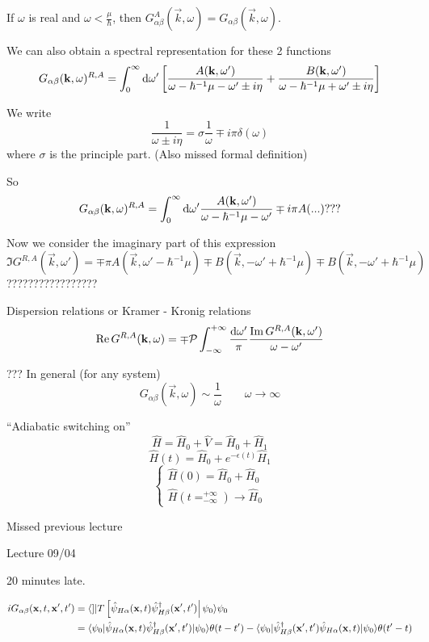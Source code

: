 If $\omega$ is real and $\omega < \frac{\mu}{\hbar}$, then $G^A_{\alpha\beta}(\vec{k},\omega) = G_{\alpha\beta}(\vec{k},\omega)$.

We can also obtain a spectral representation for these 2 functions
\[ G_{\alpha\beta}(\bm{\mathrm{k}},\omega)^{R,A} = \int^\infty_0 \operatorname{d \!}{\omega'}\left[\frac{A(\bm{\mathrm{k}},\omega')}{\omega - \hbar^{-1}\mu - \omega' \pm i\eta} + \frac{B(\bm{\mathrm{k}},\omega')}{\omega - \hbar^{-1}\mu + \omega' \pm i\eta} \right] \]

We write
\[ \frac{1}{\omega \pm i\eta} = \sigma \frac{1}{\omega} \mp i\pi\delta(\omega) \]
where $\sigma$ is the principle part. (Also missed formal definition)

So
\[ G_{\alpha\beta}(\bm{\mathrm{k}},\omega)^{R,A} = \int_0^\infty \operatorname{d \!}{\omega'}\frac{A(\bm{\mathrm{k}},\omega')}{\omega-\hbar^{-1}\mu-\omega'} \mp i\pi A(...) ??? \]


Now we consider the imaginary part of this expression
\[\Im G^{R,A}(\vec{k},\omega') = \mp \pi A(\vec{k}, \omega'-\hbar^{-1}\mu) \mp B(\vec{k}, -\omega' + \hbar^{-1}\mu) \mp B(\vec{k}, -\omega'+\hbar^{-1}\mu)\]
?????????????????

Dispersion relations or Kramer - Kronig relations
\[ \operatorname{Re} G^{R,A}(\bm{\mathrm{k}},\omega) = \mp \mathcal{P}\int^{+\infty}_{-\infty} \frac{\operatorname{d \!}{\omega'}}{\pi}\frac{\operatorname{Im} G^{R,A}(\bm{\mathrm{k}},\omega')}{\omega-\omega'} \]

???
In general (for any system)
\[ G_{\alpha\beta}(\vec{k},\omega) \sim \frac{1}{\omega} \qquad \omega \to \infty \]

``Adiabatic switching on''
\[ \hat{H} = \hat{H}_0 + \hat{V} = \hat{H}_0 + \hat{H}_1 \]
\[\hat{H}(t) = \hat{H}_0 + e^{-\epsilon(t)}\hat{H}_1\]
\[ \begin{cases}
\hat{H}(0) = \hat{H}_0 + \hat{H}_0 \\ \hat{H}(t=^{+\infty}_{-\infty}) \to \hat{H}_0
\end{cases} \]

Missed previous lecture

Lecture 09/04

20 minutes late. 

\begin{align*}
iG_{\alpha\beta}(\vec{x},t,\vec{x}',t') &= \braket[T \left[\hat{\psi}_{H\alpha}(\vec{x},t)\hat{\psi}^\dagger_{H\beta}(\vec{x}',t')\right]]{\psi_0}{\psi_0} \\
&= \braket[\hat{\psi}_{H\alpha}(\vec{x},t)\hat{\psi}_{H\beta}^\dagger(\vec{x}',t')]{\psi_0}{\psi_0}\theta(t-t') - \braket[\hat{\psi}_{H\beta}^\dagger(\vec{x}',t')\hat{\psi}_{H\alpha}(\vec{x},t)]{\psi_0}{\psi_0}\theta(t'-t)
\end{align*}

